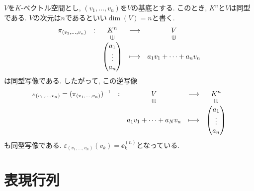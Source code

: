 \begin{remark}
  $V$を$K$-ベクトル空間とし,
  $(v_1,\ldots,v_n)$を$V$の基底とする.
  このとき, $K^n$と$V$は同型である.
  $V$の次元は$n$であるといい$\dim(V)=n$と書く.
  \begin{align*}
    \shazo{\pi_{(v_1,\ldots,v_n)}}
          {K^n}{V}
          {\begin{pmatrix}a_1\\\vdots\\a_n\end{pmatrix}}{a_1v_1+\cdots+a_n v_n}
  \end{align*}
  は同型写像である. したがって, この逆写像
  \begin{align*}
    \shazo{\varepsilon_{(v_1,\ldots,v_n)}=(\pi_{(v_1,\ldots,v_n)})^{-1}}
          {V}{K^n}
          {a_1v_1+\cdots+a_Nv_n}{\begin{pmatrix}a_1\\\vdots\\a_n\end{pmatrix}}
  \end{align*}
  も同型写像である.
  $\varepsilon_{(v_1,\ldots,v_n)}(v_k)=\ee_k^{(n)}$となっている.
\end{remark}

\section{表現行列}
